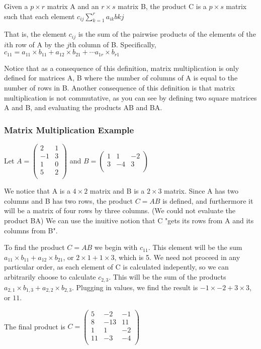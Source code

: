 \documentclass[12pt,letterpaper,final]{article}
\begin{document}
Given a $p \times r$ matrix A and an $r \times s$ matrix B, the product C is a $p \times s$ matrix such that each element $c_{ij} \sum_{k=1}^{r} a_{ik}b{kj}$

That is, the element $c_{ij}$ is the sum of the pairwise products of the elements of the $i$th row of A by the $j$th column of B. Specifically, 
$c_{11} = a_{11} \times b_{11} + a_{12} \times b_{21} + \cdots a_{1r} \times b_{r1} $

Notice that as a consequence of this definition, matrix multiplication is only defined for matrices A, B where the number of columns of A is equal to the number of rows in B. Another consequence of this definition is that matrix multiplication is not commutative, as you can see by defining two square matrices A and B, and evaluating the products AB and BA. 

\subsubsection{Matrix Multiplication Example}
Let $A =
 \begin{pmatrix}
2 & 1 \\-1 & 3 \\1 & 0\\5 & 2\\
 \end{pmatrix}
$
and $B = 
 \begin{pmatrix}
 1 & 1 & -2\\ 3 & -4 & 3\\
 \end{pmatrix}
$

We notice that A is a $4 \times 2$ matrix and B is a $2 \times 3$ matrix. Since A has two columns and B has two rows, the product $C=AB$ is defined, and furthermore it will be a matrix of four rows by three columns. (We could not evaluate the product BA) We can use the inuitive notion that C "gets its rows from A and its columns from B". 

To find the product $C=AB$ we begin with $c_{11}$. This element will be the sum$a_{11} \times b_11 + a_{12} \times b_{21}$, or $2 \times 1 + 1 \times 3$, which is 5. We need not proceed in any particular order, as each element of C is calculated indepently, so we can arbitrarily choose to calculate $c_{2,3}$. This will be the sum of the products $a_{2,1} \times b_{1,3} + a_{2,2} \times b_{2,3}$. Plugging in values, we find the result is $-1 \times -2 + 3 \times 3$, or $11$.

The final product is $C = 
 \begin{pmatrix}
 5 & -2 & -1\\ 8 & -13 & 11\\ 1 & 1 & -2 \\ 11 & -3 & -4\\ 
 \end{pmatrix}
$
\end{document}
